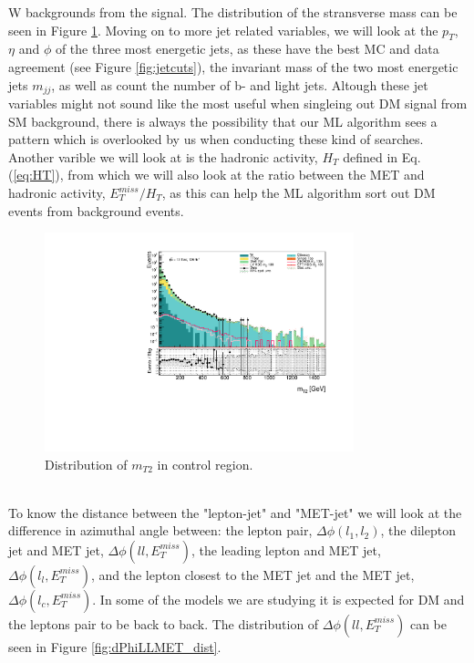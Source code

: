 \documentclass[12pt, a4paper]{book}
\begin{document}
W backgrounds from the signal. The distribution of the stransverse mass can be seen in Figure \ref{fig:mt2_dist}. Moving on to more jet related variables, we will look at the $p_T$, $\eta$ and $\phi$ of the three most energetic jets, as these have the best MC and data agreement (see Figure \ref{fig:jetcuts}), the invariant mass of the two most energetic jets $m_{jj}$, as well as count the number of b- and light jets. Altough these jet 
variables might not sound like the most useful when singleing out DM signal from SM background, there is always the possibility that our ML algorithm sees a pattern which is overlooked by us when conducting these kind of searches. 
Another varible we will look at is the hadronic activity, $H_T$ defined in Eq. (\ref{eq:HT}), from which we will also look at the ratio between the MET and hadronic activity, $E_T^{miss}/H_T$, as this can help the ML algorithm sort out DM events from background events.\\
\begin{figure}[!ht]
    \centering
        \includegraphics[width=0.8\textwidth]{mt2.pdf}
    \caption{Distribution of $m_{T2}$ in control region.}\label{fig:mt2_dist}
\end{figure}
\\To know the distance between the "lepton-jet" and "MET-jet" we will look at the difference in azimuthal angle between: the lepton pair, $\Delta\phi(l_1,l_2)$, the dilepton jet and MET jet, $\Delta\phi(ll,E_T^{miss})$, the leading lepton and MET jet, $\Delta\phi(l_l,E_T^{miss})$, 
and the lepton closest to the MET jet and the MET jet, $\Delta\phi(l_c,E_T^{miss})$. In some of the models we are studying it is expected for DM and the leptons pair to be back to back. The distribution of $\Delta\phi(ll,E_T^{miss})$ can be seen in Figure \ref{fig:dPhiLLMET_dist}.
\end{document}
